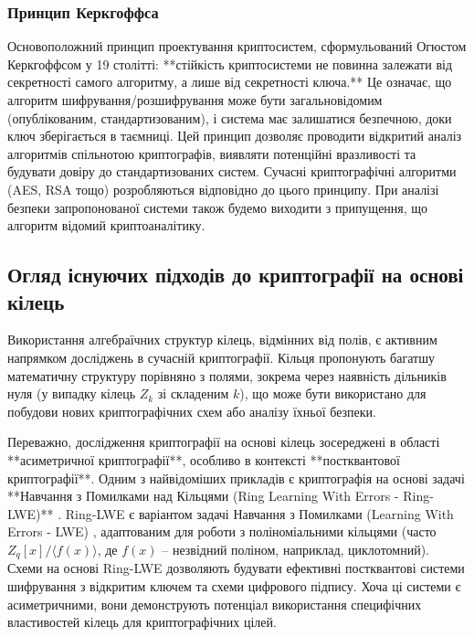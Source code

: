 \documentclass[a4paper,12pt]{article}
\begin{document}
    \subsubsection{Принцип Керкгоффса} %
    Основоположний принцип проектування криптосистем, сформульований Огюстом Керкгоффсом у 19 столітті: **стійкість криптосистеми не повинна залежати від секретності самого алгоритму, а лише від секретності ключа.**
    Це означає, що алгоритм шифрування/розшифрування може бути загальновідомим (опублікованим, стандартизованим), і система має залишатися безпечною, доки ключ зберігається в таємниці. Цей принцип дозволяє проводити відкритий аналіз алгоритмів спільнотою криптографів, виявляти потенційні вразливості та будувати довіру до стандартизованих систем. Сучасні криптографічні алгоритми (AES, RSA тощо) розробляються відповідно до цього принципу. При аналізі безпеки запропонованої системи також будемо виходити з припущення, що алгоритм відомий криптоаналітику.

    \subsection{Огляд існуючих підходів до криптографії на основі кілець} %
    Використання алгебраїчних структур кілець, відмінних від полів, є активним напрямком досліджень в сучасній криптографії. Кільця пропонують багатшу математичну структуру порівняно з полями, зокрема через наявність дільників нуля (у випадку кілець \(Z_k\) зі складеним \(k\)), що може бути використано для побудови нових криптографічних схем або аналізу їхньої безпеки.

    Переважно, дослідження криптографії на основі кілець зосереджені в області **асиметричної криптографії**, особливо в контексті **постквантової криптографії**. Одним з найвідоміших прикладів є криптографія на основі задачі **Навчання з Помилками над Кільцями (Ring Learning With Errors - Ring-LWE)** \cite{lyubashevsky_rlwe}. Ring-LWE є варіантом задачі Навчання з Помилками (Learning With Errors - LWE) \cite{regev_lwe}, адаптованим для роботи з поліноміальними кільцями (часто \(Z_q[x] / \langle f(x) \rangle\), де \(f(x)\) -- незвідний поліном, наприклад, циклотомний). Схеми на основі Ring-LWE дозволяють будувати ефективні постквантові системи шифрування з відкритим ключем та схеми цифрового підпису. Хоча ці системи є асиметричними, вони демонструють потенціал використання специфічних властивостей кілець для криптографічних цілей.
\end{document}
